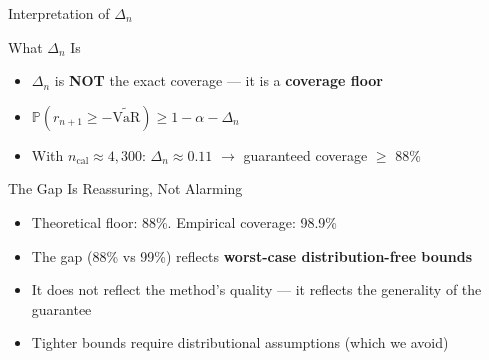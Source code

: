 \documentclass[9pt, aspectratio=169, t]{beamer}
\newcommand{\VaR}{\mathrm{VaR}}
\renewcommand{\P}{\mathbb{P}}
\begin{document}
\begin{frame}{Interpretation of $\Delta_n$}
	\vspace{-0.2cm}
	{\small
	\begin{block}{What $\Delta_n$ Is}
		\begin{itemize}\setlength{\itemsep}{3pt}
			\item $\Delta_n$ is \textbf{NOT} the exact coverage --- it is a \textbf{coverage floor}
			\item $\P(r_{n+1} \geq -\widetilde{\VaR}) \geq 1 - \alpha - \Delta_n$
			\item With $n_{\mathrm{cal}} \approx 4{,}300$: $\Delta_n \approx 0.11$ $\to$ guaranteed coverage $\geq$ 88\%
		\end{itemize}
	\end{block}
	\vspace{3mm}
	\begin{exampleblock}{The Gap Is Reassuring, Not Alarming}
		\begin{itemize}\setlength{\itemsep}{3pt}
			\item Theoretical floor: 88\%. Empirical coverage: 98.9\%
			\item The gap (88\% vs 99\%) reflects \textbf{worst-case distribution-free bounds}
			\item It does not reflect the method's quality --- it reflects the generality of the guarantee
			\item Tighter bounds require distributional assumptions (which we avoid)
		\end{itemize}
	\end{exampleblock}
	}
\end{frame}


\end{document}
